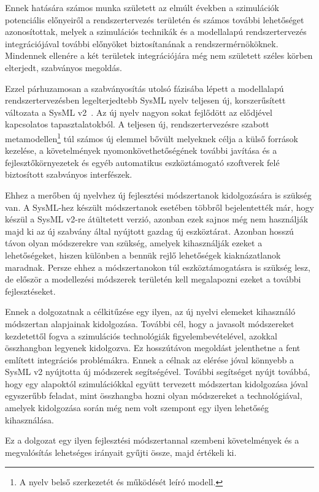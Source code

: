 Ennek hatására számos munka született az elmúlt években a szimulációk potenciális előnyeiről a rendszertervezés területén és számos további lehetőséget azonosítottak, melyek a szimulációs technikák és a modellalapú rendszertervezés integrációjával további előnyöket biztosítanának a rendszermérnököknek.
Mindennek ellenére a két területek integrációjára még nem született széles körben elterjedt, szabványos megoldás.

Ezzel párhuzamosan a szabványosítás utolsó fázisába lépett a modellalapú rendszertervezésben legelterjedtebb SysML nyelv teljesen új, korszerűsített változata a SysML v2~\cite{Bajaj_2022}.
Az új nyelv nagyon sokat fejlődött az elődjével kapcsolatos tapasztalatokból. A teljesen új, rendszertervezésre szabott metamodellen\footnote{A nyelv belső szerkezetét és működését leíró modell.} túl számos új elemmel bővült melyeknek célja a külső források kezelése, a követelmények nyomonkövethetőségének további javítása és a fejlesztőkörnyezetek és egyéb automatikus eszköztámogató szoftverek felé biztosított szabványos interfészek.

Ehhez a merőben új nyelvhez új fejlesztési módszertanok kidolgozására is szükség van.
A SysML-hez készült módszertanok esetében többről bejelentették már, hogy készül a SysML v2-re átültetett verzió, azonban ezek sajnos még nem használják majd ki az új szabvány által nyújtott gazdag új eszköztárat.
Azonban hosszú távon olyan módszerekre van szükség, amelyek kihasználják ezeket a lehetőségeket, hiszen különben a bennük rejlő lehetőségek kiaknázatlanok maradnak. Persze ehhez a módszertanokon túl eszköztámogatásra is szükség lesz, de először a modellezési módszerek területén kell megalapozni ezeket a további fejlesztéseket.

Ennek a dolgozatnak a célkitűzése egy ilyen, az új nyelvi elemeket kihasználó módszertan alapjainak kidolgozása.
További cél, hogy a javasolt módszereket kezdetettől fogva a szimulációs technológiák figyelembevételével, azokkal összhangban legyenek kidolgozva.
Ez hosszútávon megoldást jelenthetne a fent említett integrációs problémákra. Ennek a célnak az elérése jóval könnyebb a SysML v2 nyújtotta új módszerek segítségével.
További segítséget nyújt továbbá, hogy egy alapoktól szimulációkkal együtt tervezett módszertan kidolgozása jóval egyszerűbb feladat, mint összhangba hozni olyan módszereket a technológiával, amelyek kidolgozása során még nem volt szempont egy ilyen lehetőség kihasználása.

Ez a dolgozat egy ilyen fejlesztési módszertannal szembeni követelmények és a megvalósítás lehetséges irányait gyűjti össze, majd értékeli ki.

